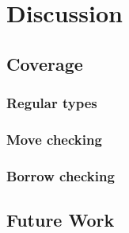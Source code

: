 \section{Discussion}

\subsection{Coverage}

\subsubsection{Regular types}


\subsubsection{Move checking}


\subsubsection{Borrow checking}


\subsection{Future Work}\label{s:future_work}
